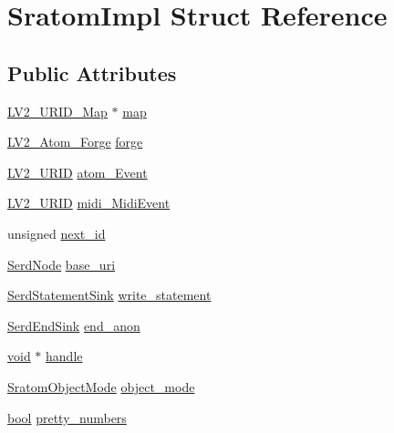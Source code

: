\hypertarget{struct_sratom_impl}{}\section{Sratom\+Impl Struct Reference}
\label{struct_sratom_impl}
\subsection*{Public Attributes}
\begin{DoxyCompactItemize}
\item 
\hyperlink{urid_8h_afefb42cd271f750506a8739f73c098c5}{L\+V2\+\_\+\+U\+R\+I\+D\+\_\+\+Map} $\ast$ \hyperlink{struct_sratom_impl_a49ce358076dcde352a47bcdb12e66af9}{map}
\item 
\hyperlink{struct_l_v2___atom___forge}{L\+V2\+\_\+\+Atom\+\_\+\+Forge} \hyperlink{struct_sratom_impl_af56a9a1fff79b6fddcfc67d138d1a0e6}{forge}
\item 
\hyperlink{urid_8h_a5ff0630d245539e9f6dca10ff3c40fae}{L\+V2\+\_\+\+U\+R\+ID} \hyperlink{struct_sratom_impl_a9ac8ae1906354506e3b796e03487d323}{atom\+\_\+\+Event}
\item 
\hyperlink{urid_8h_a5ff0630d245539e9f6dca10ff3c40fae}{L\+V2\+\_\+\+U\+R\+ID} \hyperlink{struct_sratom_impl_acad48676ba20d53bf0f63da37fc0285b}{midi\+\_\+\+Midi\+Event}
\item 
unsigned \hyperlink{struct_sratom_impl_a20ad7de8ad3b9756d8307f680fa04101}{next\+\_\+id}
\item 
\hyperlink{struct_serd_node}{Serd\+Node} \hyperlink{struct_sratom_impl_a559728865a5c92b3ce3cf1c1139ab2f6}{base\+\_\+uri}
\item 
\hyperlink{group__serd_ga9cd6dc709f738ed9770d0d2cd1195bd4}{Serd\+Statement\+Sink} \hyperlink{struct_sratom_impl_ac3d75a232ce3fb342f80b074d4035b15}{write\+\_\+statement}
\item 
\hyperlink{group__serd_gae67888543462e4127e6a4f6af047026b}{Serd\+End\+Sink} \hyperlink{struct_sratom_impl_a25160f17a4038f0129c9423cca760684}{end\+\_\+anon}
\item 
\hyperlink{sound_8c_ae35f5844602719cf66324f4de2a658b3}{void} $\ast$ \hyperlink{struct_sratom_impl_ae086890e70ea8b6c9fbd395cac361eac}{handle}
\item 
\hyperlink{group__sratom_gaf476c91b166a55d78e4aa7fc2213182f}{Sratom\+Object\+Mode} \hyperlink{struct_sratom_impl_a237e667ea1256a4dcbfb361af086c367}{object\+\_\+mode}
\item 
\hyperlink{mac_2config_2i386_2lib-src_2libsoxr_2soxr-config_8h_abb452686968e48b67397da5f97445f5b}{bool} \hyperlink{struct_sratom_impl_a5c1a8e516e8bf31d70d19a0b5c2cfb3b}{pretty\+\_\+numbers}

\end{DoxyCompactItemize}
